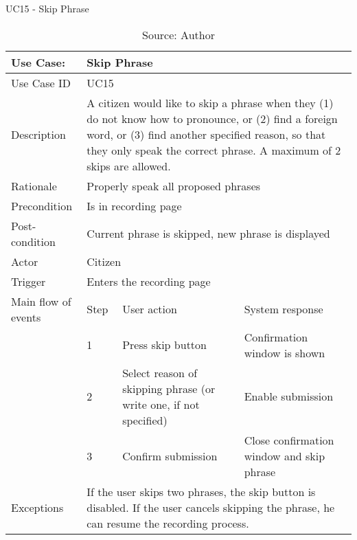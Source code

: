 \begin{table}[h]
\centering
\caption{UC15 - Skip Phrase}
\label{uc:15}
\begin{tabular}{|p{3cm}|p{1cm}|p{5cm}|p{5cm}|}
\hline
Use Case:       & \multicolumn{3}{p{11cm}|}{Skip Phrase} \\ \hline
Use Case ID     & \multicolumn{3}{p{11cm}|}{UC15} \\ \hline
Description     & \multicolumn{3}{p{11cm}|}{A citizen would like to skip a phrase when they (1) do not know how to pronounce, or (2) find a foreign word, or (3) find another specified reason, so that they only speak the correct phrase. A maximum of 2 skips are allowed.} \\ \hline
Rationale       & \multicolumn{3}{p{11cm}|}{Properly speak all proposed phrases} \\ \hline
Precondition    & \multicolumn{3}{p{11cm}|}{Is in recording page} \\ \hline
Post-condition  & \multicolumn{3}{p{11cm}|}{Current phrase is skipped, new phrase is displayed} \\ \hline
Actor           & \multicolumn{3}{p{11cm}|}{Citizen} \\ \hline
Trigger         & \multicolumn{3}{p{11cm}|}{Enters the recording page} \\ \hline
Main flow of events & Step  & User action & System response \\ \hline
                    & 1     & Press skip button & Confirmation window is shown \\ \hline
                    & 2     & Select reason of skipping phrase (or write one, if not specified) & Enable submission \\ \hline
                    & 3     & Confirm submission & Close confirmation window and skip phrase \\ \hline
Exceptions      & \multicolumn{3}{p{11cm}|}{If the user skips two phrases, the skip button is disabled. If the user cancels skipping the phrase, he can resume the recording process.} \\ \hline
\end{tabular}
\caption*{Source: Author}
\end{table}

